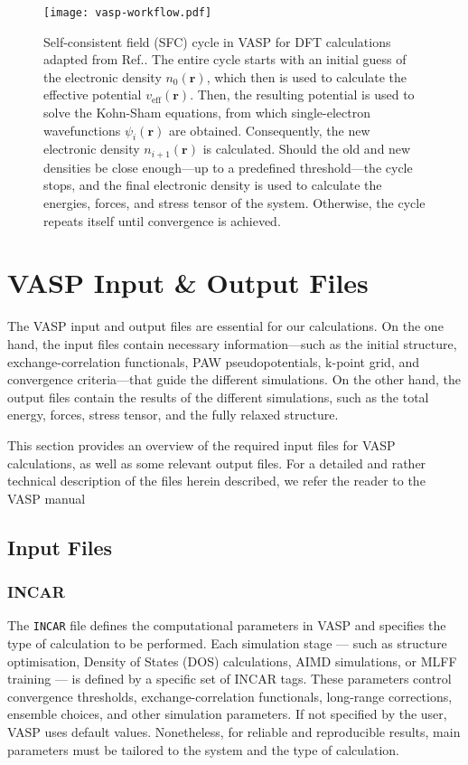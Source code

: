 \begin{figure}[h]
    \centering
    \texttt{[image: vasp-workflow.pdf]}
    \caption{
        Self-consistent field (SFC) cycle in VASP for DFT calculations adapted from Ref.\supercite{sholl2023density}. The entire cycle starts with an initial guess of the electronic density $n_0(\mathbf{r})$, which then is used to calculate the effective potential $v_{\text{eff}}(\mathbf{r})$. Then, the resulting potential is used to solve the Kohn-Sham equations, from which single-electron wavefunctions $\psi_i(\mathbf{r})$ are obtained. Consequently, the new electronic density $n_{i+1}(\mathbf{r})$ is calculated. Should the old and new densities be close enough---up to a predefined threshold---the cycle stops, and the final electronic density is used to calculate the energies, forces, and stress tensor of the system. Otherwise, the cycle repeats itself until convergence is achieved. 
    }
    \label{fig:vasp_workflow}
\end{figure}

\section{VASP Input \& Output Files}
\label{sec:vasp-input-output-files}
The VASP input and output files are essential for our calculations. On the one hand, the input files contain necessary information---such as the initial structure, exchange-correlation functionals, PAW pseudopotentials, k-point grid, and convergence criteria---that guide the different simulations. On the other hand, the output files contain the results of the different simulations, such as the total energy, forces, stress tensor, and the fully relaxed structure.

This section provides an overview of the required input files for VASP calculations, as well as some relevant output files. For a detailed and rather technical description of the files herein described, we refer the reader to the VASP manual\supercite{zotero-item-672}

\subsection{Input Files}
\subsubsection{INCAR}
The \texttt{INCAR} file defines the computational parameters in VASP and specifies the type of calculation to be performed. Each simulation stage — such as structure optimisation, Density of States (DOS) calculations, AIMD simulations, or MLFF training — is defined by a specific set of INCAR tags. These parameters control convergence thresholds, exchange-correlation functionals, long-range corrections, ensemble choices, and other simulation parameters. If not specified by the user, VASP uses default values. Nonetheless, for reliable and reproducible results, main parameters must be tailored to the system and the type of calculation.


